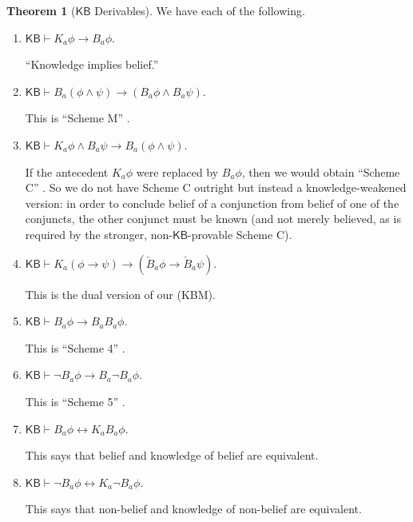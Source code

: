 \documentclass[12pt]{article}
\theoremstyle{definition}
\newtheorem{theorem}{Theorem}[section]
\newcommand{\KB}{{\mathsf{KB}}}                        %
\begin{document}
\begin{theorem}[$\KB$ Derivables]
  \label{theorem:KBgt-derivables}
  We have each of the following.
  \begin{enumerate}
  \item $\KB\vdash K_a\phi\to B_a\phi$.
    \label{derivables:KBC}

    ``Knowledge implies belief.''

  \item $\KB\vdash B_a(\phi\land\psi)\to(B_a\phi\land B_a\psi)$.
    \label{derivables:Band-andB}

    This is ``Scheme M'' \cite[Ch.~8]{Chellas:ml}.

  \item $\KB\vdash K_a\phi\land B_a\psi\to B_a(\phi\land\psi)$.
    \label{derivables:andB-Band}

    If the antecedent $K_a\phi$ were replaced by $B_a\phi$, then we
    would obtain ``Scheme C'' \cite[Ch.~8]{Chellas:ml}.  So we do not
    have Scheme C outright but instead a knowledge-weakened version:
    in order to conclude belief of a conjunction from belief of one of
    the conjuncts, the other conjunct must be known (and not merely
    believed, as is required by the stronger, non-$\KB$-provable
    Scheme C).

  \item $\KB\vdash K_a(\phi\to\psi)\to(\check B_a\phi\to\check B_a\psi)$.
    \label{derivables:check-M}

    This is the dual version of our (KBM).

    \item $\KB\vdash B_a\phi\to B_aB_a\phi$.
    \label{derivables:pos-belief}

    This is ``Scheme 4'' \cite[Ch.~8]{Chellas:ml}.

  \item $\KB\vdash \lnot B_a\phi\to B_a\lnot B_a\phi$.
    \label{derivables:neg-belief}

    This is ``Scheme 5'' \cite[Ch.~8]{Chellas:ml}.

  \item $\KB\vdash B_a\phi\leftrightarrow K_aB_a\phi$.
    \label{derivables:B-KB}

    This says that belief and knowledge of belief are equivalent.

  \item $\KB\vdash \lnot B_a\phi\leftrightarrow K_a\lnot B_a\phi$.
    \label{derivables:nB-KnB}

    This says that non-belief and knowledge of non-belief are equivalent.


\end{enumerate}
\end{theorem}
\end{document}
